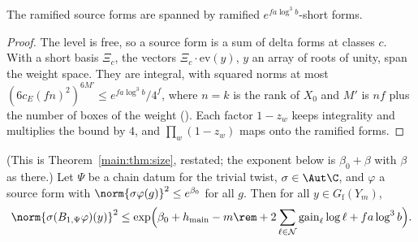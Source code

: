 \begin{proposition}\label{ub-divis:prop:short}
The ramified source forms are spanned by ramified $e^{fa\log^3b}$-short forms.
\end{proposition}

\begin{proof}
The level is free, so a source form is a sum of delta forms at classes $c$. With a short basis
$\Xi_c$, the vectors $\Xi_c\cdot\mathrm{ev}(y)$, $y$ an array of roots of unity, span the weight space.
They are integral, with squared norms at most $(6c_E(fn)^2)^{6M'}\le e^{fa\log^3b}/4^f$, where
$n=k$ is the rank of $X_0$ and $M'$ is $nf$ plus the number of boxes of the weight
(). Each factor $1-z_w$ keeps integrality and multiplies the bound by
$4$, and $\prod_w(1-z_w)$ maps onto the ramified forms.
\end{proof}

\begin{theorem}\label{ub-divis:thm:size}
(This is Theorem~\ref{main:thm:size}, restated; the exponent below is $\beta_0+\beta$ with $\beta$
as there.) Let $\Psi$ be a chain datum for the trivial twist, $\sigma\in\Aut\C$, and $\varphi$ a source form
with $\norm{\sigma\varphi(g)}^2\le e^{\beta_0}$ for all $g$. Then for all $y\in G_{\mathrm f}(Y_m)$,
\[\norm{\sigma(B_{1,\Psi}\varphi)(y)}^2\le\exp\Bigl(\beta_0+h_{\mathrm{main}}-m\rem+2\sum_{\ell\in\mathcal N}\mathrm{gain}_\ell\log \ell+fa\log^3b\Bigr).\]
\end{theorem}

